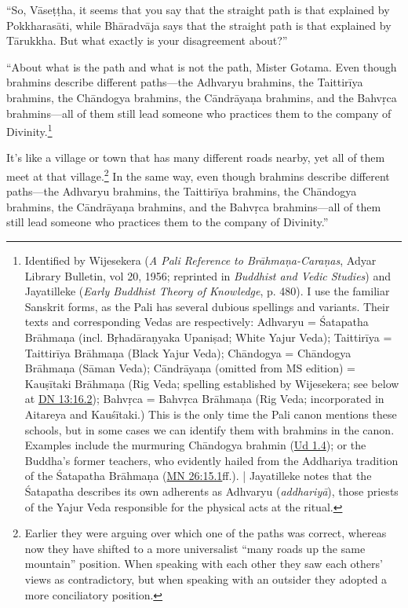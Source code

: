 \documentclass[12pt,openany]{book}%
\begin{document}
“So, \textsanskrit{Vāseṭṭha}, it seems that you say that the straight path is that explained by \textsanskrit{Pokkharasāti}, while \textsanskrit{Bhāradvāja} says that the straight path is that explained by \textsanskrit{Tārukkha}. But what exactly is your disagreement about?” 

“About what is the path and what is not the path, Mister Gotama. Even though brahmins describe different paths—the Adhvaryu brahmins, the \textsanskrit{Taittirīya} brahmins, the \textsanskrit{Chāndogya} brahmins, the \textsanskrit{Cāndrāyaṇa} brahmins, and the \textsanskrit{Bahvṛca} brahmins—all of them still lead someone who practices them to the company of Divinity.\footnote{Identified by Wijesekera (\emph{A Pali Reference to \textsanskrit{Brāhmaṇa}-\textsanskrit{Caraṇas}}, Adyar Library Bulletin, vol 20, 1956; reprinted in \emph{Buddhist and Vedic Studies}) and Jayatilleke (\emph{Early Buddhist Theory of Knowledge}, p. 480). I use the familiar Sanskrit forms, as the Pali has several dubious spellings and variants. Their texts and corresponding Vedas are respectively: Adhvaryu = Śatapatha \textsanskrit{Brāhmaṇa} (incl. \textsanskrit{Bṛhadāraṇyaka} \textsanskrit{Upaniṣad}; White Yajur Veda); \textsanskrit{Taittirīya} = \textsanskrit{Taittirīya} \textsanskrit{Brāhmaṇa} (Black Yajur Veda); \textsanskrit{Chāndogya} = \textsanskrit{Chāndogya} \textsanskrit{Brāhmaṇa} (\textsanskrit{Sāman} Veda); \textsanskrit{Cāndrāyaṇa} (omitted from MS edition) = \textsanskrit{Kauṣītaki} \textsanskrit{Brāhmaṇa} (Rig Veda; spelling established by Wijesekera; see below at \href{https://suttacentral.net/dn13/en/sujato\#16.2}{DN 13:16.2}); \textsanskrit{Bahvṛca} = \textsanskrit{Bahvṛca} \textsanskrit{Brāhmaṇa} (Rig Veda; incorporated in Aitareya and \textsanskrit{Kauśītaki}.) This is the only time the Pali canon mentions these schools, but in some cases we can identify them with brahmins in the canon. Examples include the murmuring \textsanskrit{Chāndogya} brahmin (\href{https://suttacentral.net/ud1.4/en/sujato}{Ud 1.4}); or the Buddha’s former teachers, who evidently hailed from the Addhariya tradition of the Śatapatha \textsanskrit{Brāhmaṇa} (\href{https://suttacentral.net/mn26/en/sujato\#15.1}{MN 26:15.1}ff.). | Jayatilleke notes that the Śatapatha describes its own adherents as Adhvaryu (\textit{\textsanskrit{addhariyā}}), those priests of the Yajur Veda responsible for the physical acts at the ritual. } 

It’s like a village or town that has many different roads nearby, yet all of them meet at that village.\footnote{Earlier they were arguing over which one of the paths was correct, whereas now they have shifted to a more universalist “many roads up the same mountain” position. When speaking with each other they saw each others’ views as contradictory, but when speaking with an outsider they adopted a more conciliatory position. } In the same way, even though brahmins describe different paths—the Adhvaryu brahmins, the \textsanskrit{Taittirīya} brahmins, the \textsanskrit{Chāndogya} brahmins, the \textsanskrit{Cāndrāyaṇa} brahmins, and the \textsanskrit{Bahvṛca} brahmins—all of them still lead someone who practices them to the company of Divinity.” 
\end{document}
